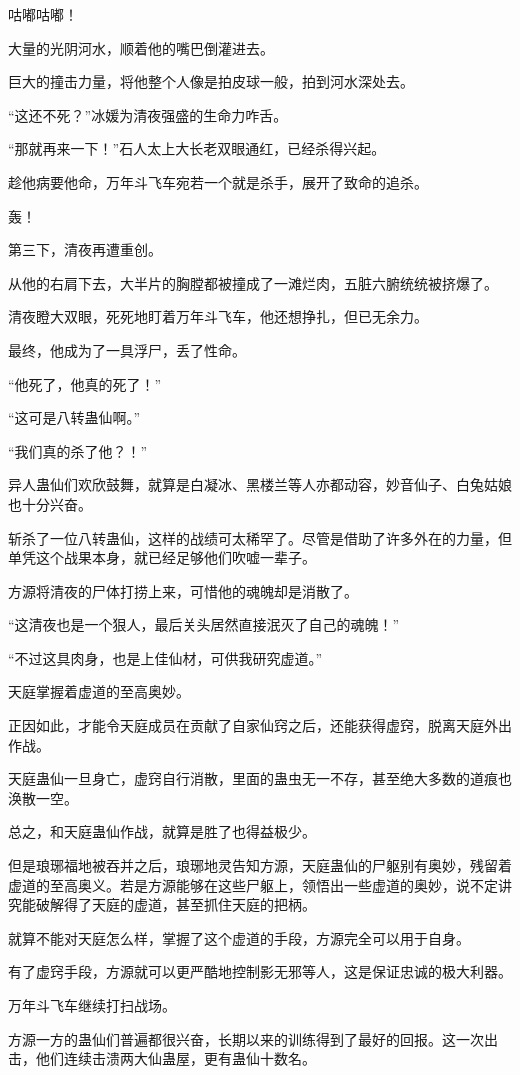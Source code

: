 \begin{this_body}
咕嘟咕嘟！

大量的光阴河水，顺着他的嘴巴倒灌进去。

巨大的撞击力量，将他整个人像是拍皮球一般，拍到河水深处去。

“这还不死？”冰媛为清夜强盛的生命力咋舌。

“那就再来一下！”石人太上大长老双眼通红，已经杀得兴起。

趁他病要他命，万年斗飞车宛若一个就是杀手，展开了致命的追杀。

轰！

第三下，清夜再遭重创。

从他的右肩下去，大半片的胸膛都被撞成了一滩烂肉，五脏六腑统统被挤爆了。

清夜瞪大双眼，死死地盯着万年斗飞车，他还想挣扎，但已无余力。

最终，他成为了一具浮尸，丢了性命。

“他死了，他真的死了！”

“这可是八转蛊仙啊。”

“我们真的杀了他？！”

异人蛊仙们欢欣鼓舞，就算是白凝冰、黑楼兰等人亦都动容，妙音仙子、白兔姑娘也十分兴奋。

斩杀了一位八转蛊仙，这样的战绩可太稀罕了。尽管是借助了许多外在的力量，但单凭这个战果本身，就已经足够他们吹嘘一辈子。

方源将清夜的尸体打捞上来，可惜他的魂魄却是消散了。

“这清夜也是一个狠人，最后关头居然直接泯灭了自己的魂魄！”

“不过这具肉身，也是上佳仙材，可供我研究虚道。”

天庭掌握着虚道的至高奥妙。

正因如此，才能令天庭成员在贡献了自家仙窍之后，还能获得虚窍，脱离天庭外出作战。

天庭蛊仙一旦身亡，虚窍自行消散，里面的蛊虫无一不存，甚至绝大多数的道痕也涣散一空。

总之，和天庭蛊仙作战，就算是胜了也得益极少。

但是琅琊福地被吞并之后，琅琊地灵告知方源，天庭蛊仙的尸躯别有奥妙，残留着虚道的至高奥义。若是方源能够在这些尸躯上，领悟出一些虚道的奥妙，说不定讲究能破解得了天庭的虚道，甚至抓住天庭的把柄。

就算不能对天庭怎么样，掌握了这个虚道的手段，方源完全可以用于自身。

有了虚窍手段，方源就可以更严酷地控制影无邪等人，这是保证忠诚的极大利器。

万年斗飞车继续打扫战场。

方源一方的蛊仙们普遍都很兴奋，长期以来的训练得到了最好的回报。这一次出击，他们连续击溃两大仙蛊屋，更有蛊仙十数名。


\end{this_body}
